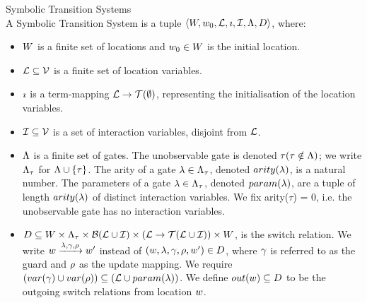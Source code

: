 \begin{definition} Symbolic Transition Systems \\
A Symbolic Transition System is a tuple $\langle W,w_0,\mathcal{L},\imath,\mathcal{I},\Lambda,D\rangle$, where:
\begin{itemize}
\item $W$ is a finite set of locations and $w_0 \in W$ is the initial location.
\item $\mathcal{L} \subseteq \mathcal{V}$ is a finite set of location variables.
\item $\imath$ is a term-mapping $\mathcal{L} \rightarrow \mathcal{T}(\emptyset)$, representing the initialisation of the location variables.
\item $\mathcal{I} \subseteq \mathcal{V}$ is a set of interaction variables, disjoint from $\mathcal{L}$.
\item $\Lambda$ is a finite set of gates. The unobservable gate is denoted $\tau (\tau \notin \Lambda)$; we write $\Lambda_\tau$ for $\Lambda \cup \{\tau\}$. The arity of a gate $\lambda\in\Lambda_\tau$, denoted $arity(\lambda)$, is a natural number. The parameters of a gate $\lambda\in\Lambda_\tau$, denoted $param(\lambda)$, are a tuple of length $arity(\lambda)$ of distinct interaction variables. We fix arity($\tau$) = 0, i.e. the unobservable gate has no interaction variables.
\item $D \subseteq W \times \Lambda_\tau \times \mathcal{B}(\mathcal{L} \cup \mathcal{I}) \times (\mathcal{L} \rightarrow \mathcal{T}(\mathcal{L} \cup \mathcal{I})) \times W$, is the switch relation. We write $w\xrightarrow{\lambda,\gamma,\rho}w'$ instead of $(w,\lambda,\gamma,\rho,w')\in D$, where $\gamma$ is referred to as the guard and $\rho$ as the update mapping. We require $(var(\gamma) \cup var(\rho)) \subseteq (\mathcal{L} \cup param(\lambda))$. We define $out(w) \subseteq D$ to be the outgoing switch relations from location $w$.
\end{itemize}
\end{definition}
